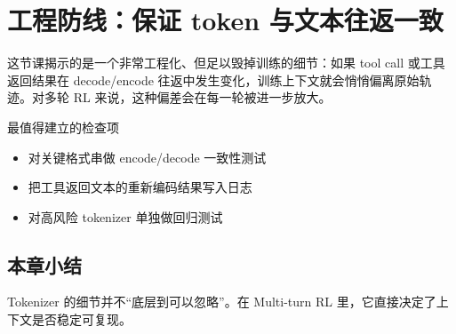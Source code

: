 \section{工程防线：保证 token 与文本往返一致}
这节课揭示的是一个非常工程化、但足以毁掉训练的细节：如果 tool call 或工具返回结果在 decode/encode 往返中发生变化，训练上下文就会悄悄偏离原始轨迹。对多轮 RL 来说，这种偏差会在每一轮被进一步放大。

\begin{warningbox}{最值得建立的检查项}
\begin{itemize}
  \item 对关键格式串做 encode/decode 一致性测试
  \item 把工具返回文本的重新编码结果写入日志
  \item 对高风险 tokenizer 单独做回归测试
\end{itemize}
\end{warningbox}

\subsection{本章小结}
Tokenizer 的细节并不“底层到可以忽略”。在 Multi-turn RL 里，它直接决定了上下文是否稳定可复现。

\newpage
